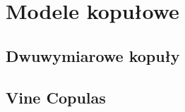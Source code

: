 \chapter{Modele kopułowe}
\label{ch:modele_kopulowe}


\section{Dwuwymiarowe kopuły}
\label{sec:dwuwymiarowe_kopuly}


\section{Vine Copulas}
\label{sec:vine_copulas}

		
\mgrclosechapter